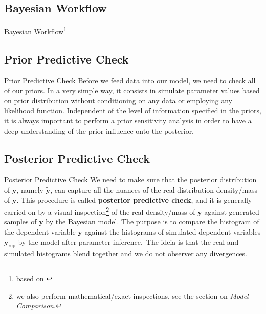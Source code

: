 \subsection{Bayesian Workflow}
\begin{frame}{Bayesian Workflow\footnote{based on \textcite{gelmanBayesianWorkflow2020}}}
	\centering
\end{frame}

\subsection{Prior Predictive Check}
\begin{frame}{Prior Predictive Check}
	Before we feed data into our model, 
	we need to check all of our priors.
	\vfill
	In a very simple way, it consists in simulate parameter values based on
	prior distribution without conditioning on any data or employing any
	likelihood function.
	\vfill
	Independent of the level of information specified in the priors,
	it is always important to perform a prior sensitivity analysis
	in order to have a deep understanding of the prior influence onto
	the posterior.
\end{frame}

\subsection{Posterior Predictive Check}
\begin{frame}{Posterior Predictive Check}
	We need to make sure that the posterior distribution of $\mathbf{y}$,
	namely $\boldsymbol{\tilde{y}}$,
	can capture all the nuances of the real distribution density/mass of $\mathbf{y}$.
	\vfill
	This procedure is called \textbf{posterior predictive check},
	and it is generally carried on by a visual inspection\footnote{
		we also perform mathematical/exact inspections,
		see the section on \textit{Model Comparison}.}
	of the real density/mass of $\mathbf{y}$ against generated samples
	of $\mathbf{y}$ by the Bayesian model.
	\vfill
	The purpose is to compare the histogram of the dependent variable $\mathbf{y}$
	against the histograms of simulated dependent variables $\mathbf{y}_{\text{rep}}$
	by the model after parameter inference.\
	The ideia is that the real and simulated histograms blend together and
	we do not observer any divergences.
\end{frame}

